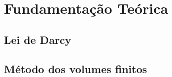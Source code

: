 \documentclass[professionalfont]{beamer}
\begin{document}
\section{Fundamentação Teórica}

\subsection{Lei de Darcy}


    
    


\subsection{Método dos volumes finitos}
\end{document}
